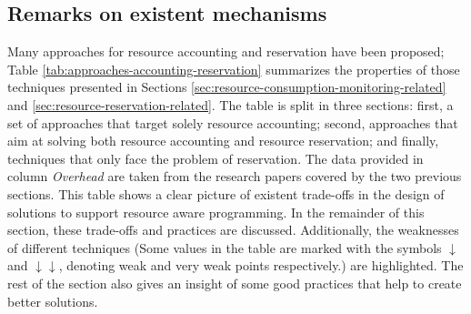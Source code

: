 \subsection{Remarks on existent mechanisms} \label{sec:discussion-related-work}

Many approaches for resource accounting and reservation have been proposed; Table \ref{tab:approaches-accounting-reservation} summarizes the properties of those techniques presented in Sections \ref{sec:resource-consumption-monitoring-related} and \ref{sec:resource-reservation-related}.
The table is split in three sections: first, a set of approaches that target solely resource accounting; second, approaches that aim at solving both resource accounting and resource reservation; and finally, techniques that only face the problem of reservation.
The data provided in column \textit{Overhead} are taken from the research papers covered by the two previous sections.
This table shows a clear picture of existent trade-offs in the design of solutions to support resource aware programming.
In the remainder of this section, these trade-offs and practices are discussed.
Additionally, the weaknesses of different techniques (Some values in the table are marked with the symbols $ \downarrow $ and $\downarrow\downarrow$, denoting weak and very weak points respectively.) are highlighted.
The rest of the section also gives an insight of some good practices that help to create better solutions.

\newcommand{\weakp}{$\downarrow \downarrow$}
\newcommand{\weak}{$\downarrow$}

